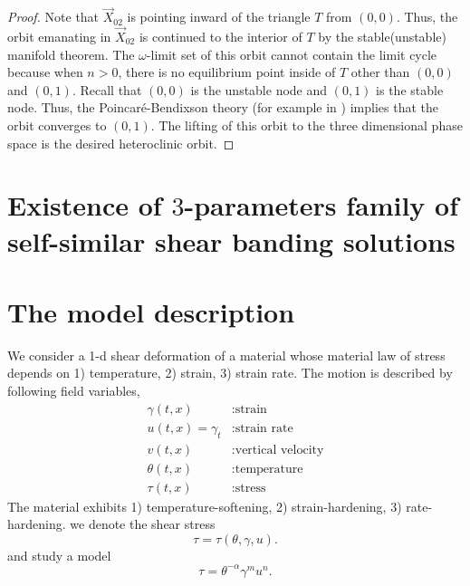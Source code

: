 \documentclass[a4paper,11pt]{article}
\def\red{\color{red}}
\begin{document}
\begin{proof}
\medskip

Note that $\vec{X}_{02}$ is pointing inward of the triangle $T$ from $(0,0)$. Thus, the orbit emanating in $\vec{X}_{02}$ is continued to the interior of $T$ by the stable(unstable) manifold theorem. The $\omega$-limit set of this orbit cannot contain the limit cycle because when $n>0$, there is no equilibrium point inside of $T$ other than $(0,0)$ and $(0,1)$. Recall that $(0,0)$ is the unstable node and $(0,1)$ is the stable node. Thus, the Poincar\'e-Bendixson theory (for example in \cite{perko_differential_2001}) implies that the orbit converges to $(0,1)$.  The lifting of this orbit to the three dimensional phase space is the desired heteroclinic orbit. %
\end{proof}

\section{Existence of $3$-parameters family of self-similar shear banding solutions}




\section{The model description}
We consider a 1-d shear deformation of a material whose material law of stress depends on 1) temperature, 2) strain, 3) strain rate. The motion is described by following field variables,
\begin{equation} \label{eq:vars}
\begin{aligned}
 \gamma(t,x) &: \text{strain}\\
 u(t,x)=\gamma_t &: \text{strain rate}\\
 v(t,x) &: \text{vertical velocity}\\
 \theta(t,x) &: \text{temperature}\\
 \tau(t,x) &: \text{stress}
\end{aligned}
\end{equation}
The material exhibits 1) temperature-softening, 2) strain-hardening, 3) rate-hardening. we denote the shear stress
$$ \tau = \tau(\theta,\gamma,u). $$
and study a model
\begin{equation}
 \tau = \theta^{-\alpha}\gamma^m u^n. \label{eq:stresslaw}
\end{equation}
\end{document}
